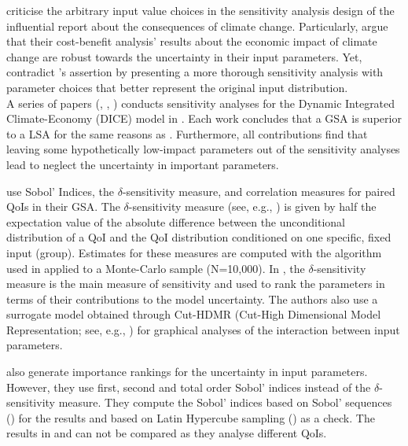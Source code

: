 \newline
\cite{Saltelli.2010} criticise the arbitrary input value choices in the sensitivity analysis design of the influential \cite{Stern.2007} report about the consequences of climate change. Particularly, \citeauthor{Stern.2007} argue that their cost-benefit analysis' results about the economic impact of climate change are robust towards the uncertainty in their input parameters. Yet, \cite{Saltelli.2010} contradict \citeauthor{Stern.2007}'s assertion by presenting a more thorough sensitivity analysis with parameter choices that better represent the original input distribution.\\
\newline
A series of papers (\cite{Anderson.2014}, \cite{Butler.2014}, \cite{Miftakhova.2018}) conducts sensitivity analyses for the Dynamic Integrated Climate-Economy (DICE) model in \cite{Nordhaus.2008}.  Each work concludes that a GSA is superior to a LSA for the same reasons as \cite{Harenberg.2019}. Furthermore, all contributions find that leaving some hypothetically low-impact parameters out of the sensitivity analyses lead \citeauthor{Nordhaus.2008} to neglect the uncertainty in important parameters.

\cite{Anderson.2014} use Sobol' Indices, the $\delta$-sensitivity measure, and correlation measures for paired QoIs in their GSA. The $\delta$-sensitivity measure (see, e.g., \cite{Borgonovo.2006}) is given by half the expectation value of the absolute difference between the unconditional distribution of a QoI and the QoI distribution conditioned on one specific, fixed input (group). Estimates for these measures are computed with the algorithm used in \cite{Plischke.2013} applied to a Monte-Carlo sample (N=10,000). In \cite{Anderson.2014}, the $\delta$-sensitivity measure is the main measure of sensitivity and used to rank the parameters in terms of their contributions to the model uncertainty. The authors also use a surrogate model obtained through Cut-HDMR (Cut-High Dimensional Model Representation; see, e.g., \cite{Ziehn.2009}) for graphical analyses of the interaction between input parameters.

\cite{Butler.2014} also generate importance rankings for the uncertainty in input parameters. However, they use first, second and total order Sobol' indices instead of the $\delta$-sensitivity measure. They compute the Sobol' indices based on Sobol' sequences (\cite{Sobol.1967}) for the results and based on Latin Hypercube sampling (\cite{McKay.1979}) as a check. The results in \cite{Butler.2014} and \cite{Anderson.2014} can not be compared as they analyse different QoIs.

